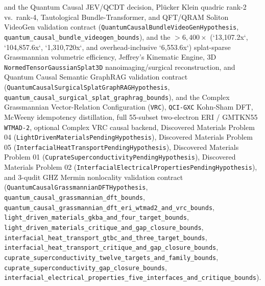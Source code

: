 and the Quantum Causal JEV/QCDT decision, Plücker Klein quadric rank-2 vs.\
rank-4, Tautological Bundle-Transformer, and QFT/QRAM Soliton VideoGen
validation contract
(\texttt{QuantumCausalBundleVideoGenHypothesis},
\texttt{quantum\_causal\_bundle\_videogen\_bounds}),
and the $>6{,}400\times$ (`13,107.2x`, `104,857.6x`, `1,310,720x`, and overhead-inclusive `6,553.6x`)
splat-sparse Grassmannian volumetric efficiency, Jeffrey's Kinematic Engine, 3D
\texttt{NormedTensorGaussianSplat3D} nanoimaging/surgical reconstruction, and Quantum Causal
Semantic GraphRAG validation contract
(\texttt{QuantumCausalSurgicalSplatGraphRAGHypothesis},
\texttt{quantum\_causal\_surgical\_splat\_graphrag\_bounds}),
and the Complex Grassmannian Vector-Relation Configuration (\texttt{VRC}),
\texttt{QCI-GXC} Kohn-Sham DFT, McWeeny idempotency distillation, full 55-subset
two-electron ERI / GMTKN55 \texttt{WTMAD-2}, optional Complex VRC causal backend,
Discovered Materials Problem 04 (\texttt{LightDrivenMaterialsPendingHypothesis}),
Discovered Materials Problem 05 (\texttt{InterfacialHeatTransportPendingHypothesis}),
Discovered Materials Problem 01 (\texttt{CuprateSuperconductivityPendingHypothesis}),
Discovered Materials Problem 02 (\texttt{InterfacialElectricalPropertiesPendingHypothesis}),
and 3-qudit GHZ Mermin nonlocality validation contract
(\texttt{QuantumCausalGrassmannianDFTHypothesis},
\texttt{quantum\_causal\_grassmannian\_dft\_bounds},
\texttt{quantum\_causal\_grassmannian\_dft\_eri\_wtmad2\_and\_vrc\_bounds},
\texttt{light\_driven\_materials\_gkba\_and\_four\_target\_bounds},
\texttt{light\_driven\_materials\_critique\_and\_gap\_closure\_bounds},
\texttt{interfacial\_heat\_transport\_gtbc\_and\_three\_target\_bounds},
\texttt{interfacial\_heat\_transport\_critique\_and\_gap\_closure\_bounds},
\texttt{cuprate\_superconductivity\_twelve\_targets\_and\_family\_bounds},
\texttt{cuprate\_superconductivity\_gap\_closure\_bounds},
\texttt{interfacial\_electrical\_properties\_five\_interfaces\_and\_critique\_bounds}).

